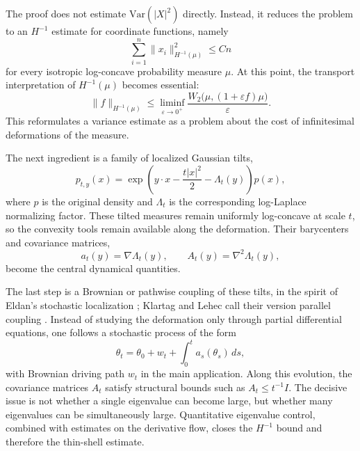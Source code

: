 \documentclass[10pt]{article}
\begin{document}
The proof does not estimate $\mathrm{Var}(|X|^2)$ directly. Instead, it reduces the problem to an $H^{-1}$ estimate for coordinate functions, namely
\[
\sum_{i=1}^n \|x_i\|_{H^{-1}(\mu)}^2\leq Cn
\]
for every isotropic log-concave probability measure $\mu$. At this point, the transport interpretation of $H^{-1}(\mu)$ becomes essential:
\[
\|f\|_{H^{-1}(\mu)}
\leq \liminf_{\varepsilon\to 0^+}
\frac{W_2\bigl(\mu,(1+\varepsilon f)\mu\bigr)}{\varepsilon}.
\]
This reformulates a variance estimate as a problem about the cost of infinitesimal deformations of the measure.

The next ingredient is a family of localized Gaussian tilts,
\[
p_{t,y}(x)=\exp\!\left( y\cdot x-\frac{t|x|^2}{2}-\Lambda_t(y)\right)p(x),
\]
where $p$ is the original density and $\Lambda_t$ is the corresponding log-Laplace normalizing factor. These tilted measures remain uniformly log-concave at scale $t$, so the convexity tools remain available along the deformation. Their barycenters and covariance matrices,
\[
a_t(y)=\nabla\Lambda_t(y), \qquad A_t(y)=\nabla^2\Lambda_t(y),
\]
become the central dynamical quantities.

The last step is a Brownian or pathwise coupling of these tilts, in the spirit of Eldan's stochastic localization \cite{Eld13}; Klartag and Lehec call their version parallel coupling \cite{KL25}. Instead of studying the deformation only through partial differential equations, one follows a stochastic process of the form
\[
\theta_t=\theta_0+w_t+\int_0^t a_s(\theta_s)\,ds,
\]
with Brownian driving path $w_t$ in the main application. Along this evolution, the covariance matrices $A_t$ satisfy structural bounds such as $A_t\leq t^{-1}I$. The decisive issue is not whether a single eigenvalue can become large, but whether many eigenvalues can be simultaneously large. Quantitative eigenvalue control, combined with estimates on the derivative flow, closes the $H^{-1}$ bound and therefore the thin-shell estimate.
\end{document}
